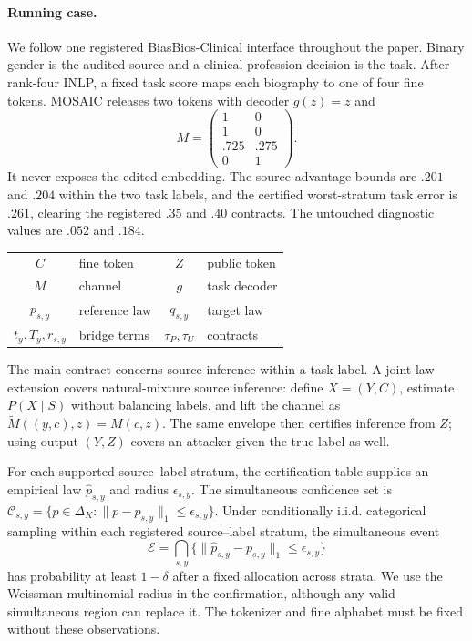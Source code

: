 \paragraph{Running case.}
We follow one registered BiasBios-Clinical interface throughout the paper.
Binary gender is the audited source and a clinical-profession decision is the
task. After rank-four INLP, a fixed task score maps each biography to one of
four fine tokens. MOSAIC releases two tokens with decoder $g(z)=z$ and
\[
M=\begin{pmatrix}1&0\\1&0\\.725&.275\\0&1\end{pmatrix}.
\]
It never exposes the edited embedding. The source-advantage bounds are $.201$
and $.204$ within the two task labels, and the certified worst-stratum task
error is $.261$, clearing the registered $.35$ and $.40$ contracts. The
untouched diagnostic values are $.052$ and $.184$.

\begin{center}
\scriptsize
\begin{tabular}{@{}clcl@{}}
$C$ & fine token & $Z$ & public token \\
$M$ & channel & $g$ & task decoder \\
$p_{s,y}$ & reference law & $q_{s,y}$ & target law \\
$t_y,T_y,r_{s,y}$ & bridge terms & $\tau_P,\tau_U$ & contracts
\end{tabular}
\end{center}

The main contract concerns source inference within a task label. A joint-law
extension covers natural-mixture source inference: define $X=(Y,C)$, estimate
$P(X\mid S)$ without balancing labels, and lift the channel as
$\widetilde M((y,c),z)=M(c,z)$. The same envelope then certifies inference from
$Z$; using output $(Y,Z)$ covers an attacker given the true label as well.

For each supported source--label stratum, the certification table supplies an
empirical law $\widehat p_{s,y}$ and radius $\epsilon_{s,y}$. The simultaneous
confidence set is
$\mathcal C_{s,y}=\{p\in\Delta_K:\|p-\widehat p_{s,y}\|_1\leq
\epsilon_{s,y}\}$. Under conditionally i.i.d. categorical sampling within each
registered source--label stratum, the simultaneous event
\begin{equation}
 \mathcal E=\bigcap_{s,y}
 \{\|\widehat p_{s,y}-p_{s,y}\|_1\leq\epsilon_{s,y}\}
 \label{eq:event}
\end{equation}
has probability at least $1-\delta$ after a fixed allocation across strata. We
use the Weissman multinomial radius \citep{weissman2003l1} in the confirmation,
although any valid
simultaneous region can replace it. The tokenizer and fine alphabet must be
fixed without these observations.

